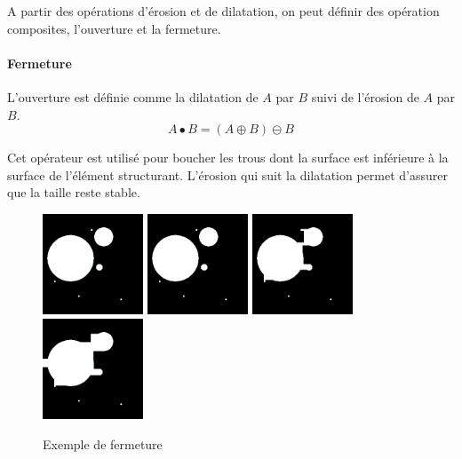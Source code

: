 A partir des opérations d'érosion et de dilatation, on peut définir des opération composites, l'ouverture et la fermeture.

\paragraph{Fermeture}
L'ouverture est définie comme la dilatation de $A$ par $B$ suivi de l'érosion de $A$ par $B$.
\begin{equation}
 A \bullet B = (A \oplus B) \ominus B
\end{equation}

Cet opérateur est utilisé pour boucher les trous dont la surface est inférieure à la surface de l'élément structurant. L'érosion qui suit la dilatation permet d'assurer que la taille reste stable.

\begin{figure}
  \centering
  \includegraphics[height=3cm]{Images/morpho_init.png}
  \includegraphics[height=3cm]{Images/morpho_close_k5.png}
  \includegraphics[height=3cm]{Images/morpho_close_k21.png}
  \includegraphics[height=3cm]{Images/morpho_close_k31.png}
  \label{fig:morpho_femerture}
  \caption{Exemple de fermeture}
\end{figure}

